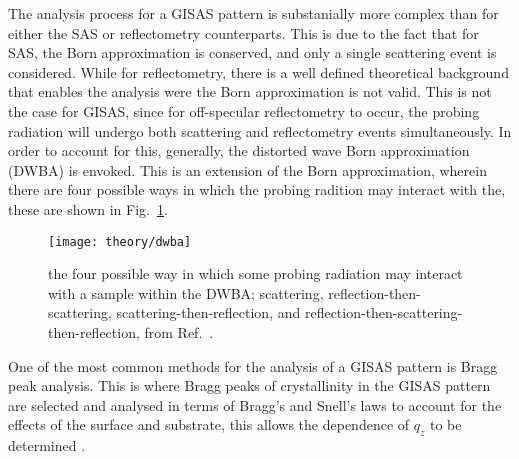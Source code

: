 The analysis process for a GISAS pattern is substanially more complex than for either the SAS or reflectometry counterparts.
This is due to the fact that for SAS, the Born approximation is conserved, and only a single scattering event is considered.
While for reflectometry, there is a well defined theoretical background that enables the analysis were the Born approximation is not valid.
This is not the case for GISAS, since for off-specular reflectometry to occur, the probing radiation will undergo both scattering and reflectometry events simultaneously.
In order to account for this, generally, the distorted wave Born approximation (DWBA) is envoked.
This is an extension of the Born approximation, wherein there are four possible ways in which the probing radition may interact with the, these are shown in Fig.~\ref{fig:dwba}.
%
\begin{figure}
	\centering
	\texttt{[image: theory/dwba]}
	\caption{the four possible way in which some probing radiation may interact with a sample within the DWBA; scattering, reflection-then-scattering, scattering-then-reflection, and reflection-then-scattering-then-reflection, from Ref.~\cite{Hexemer2015}.}
	\label{fig:dwba}
\end{figure}
%

One of the most common methods for the analysis of a GISAS pattern is Bragg peak analysis.
This is where Bragg peaks of crystallinity in the GISAS pattern are selected and analysed in terms of Bragg's and Snell's laws to account for the effects of the surface and substrate, this allows the dependence of $q_z$ to be determined \cite{Lee2007, Busch2006}.
